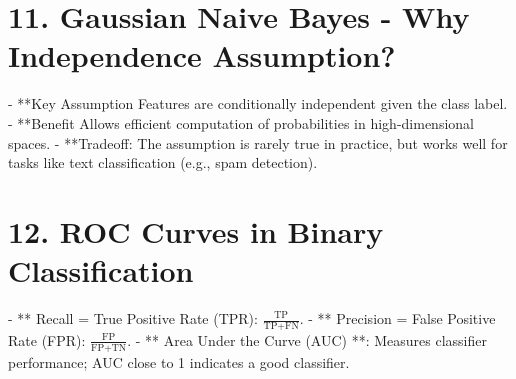 \documentclass[10pt]{article}
\begin{document}
\begin{multicols}{2}
\section*{11. Gaussian Naive Bayes - Why Independence Assumption?}
- **Key Assumption Features are conditionally independent given the class label.
- **Benefit Allows efficient computation of probabilities in high-dimensional spaces.
- **Tradeoff: The assumption is rarely true in practice, but works well for tasks like text classification (e.g., spam detection).

\section*{12. ROC Curves in Binary Classification}
- ** Recall = True Positive Rate (TPR): $\frac{\text{TP}}{\text{TP} + \text{FN}}$.
- ** Precision = False Positive Rate (FPR): $\frac{\text{FP}}{\text{FP} + \text{TN}}$.
- ** Area Under the Curve (AUC) **: Measures classifier performance; AUC close to 1 indicates a good classifier.

\end{multicols}
\end{document}
